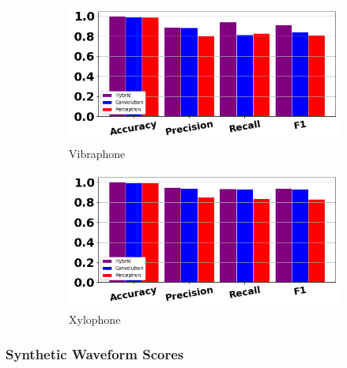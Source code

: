 \documentclass[12pt,letterpaper]{article}
\begin{document}
\begin{figure}[H]
	\begin{subfigure}[b]{0.45\textwidth}
	\centering
	\includegraphics[width=\textwidth]{../FiguresClasses/Vibraphone}
	\caption{Vibraphone}
	\end{subfigure}	
	\hfill
	\begin{subfigure}[b]{0.45\textwidth}
	\centering
	\includegraphics[width=\textwidth]{../FiguresClasses/Xylophone}
	\caption{Xylophone}
	\end{subfigure}	

\caption{}
\label{fig-PercussionScores}
\end{figure}


\subsubsection{Synthetic Waveform Scores}
\end{document}
